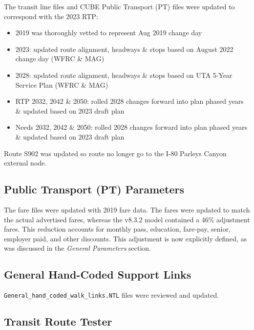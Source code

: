 \documentclass[
  letterpaper,
  DIV=11,
  numbers=noendperiod,
  titlepage=false]{scrreprt}
\providecommand{\tightlist}{%
  \setlength{\itemsep}{0pt}\setlength{\parskip}{0pt}}\usepackage{longtable,booktabs,array}
\begin{document}
The transit line files and CUBE Public Transport (PT) files were updated
to correspond with the 2023 RTP:

\begin{itemize}
\tightlist
\item
  2019 was thoroughly vetted to represent Aug 2019 change day
\item
  2023: updated route alignment, headways \& stops based on August 2022
  change day (WFRC \& MAG)
\item
  2028: updated route alignment, headways \& stops based on UTA 5-Year
  Service Plan (WFRC \& MAG)
\item
  RTP 2032, 2042 \& 2050: rolled 2028 changes forward into plan phased
  years \& updated based on 2023 draft plan
\item
  Needs 2032, 2042 \& 2050: rolled 2028 changes forward into plan phased
  years \& updated based on 2023 draft plan
\end{itemize}

Route S902 was updated so route no longer go to the I-80 Parleys Canyon
external node.

\hypertarget{public-transport-pt-parameters}{%
\subsection{Public Transport (PT)
Parameters}\label{public-transport-pt-parameters}}

The fare files were updated with 2019 fare data. The fares were updated
to match the actual advertised fares, whereas the v8.3.2 model contained
a 46\% adjustment fares. This reduction accounts for monthly pass,
education, fare-pay, senior, employer paid, and other discounts. This
adjustment is now explicitly defined, as was discussed in the
\emph{General Parameters} section.

\hypertarget{general-hand-coded-support-links}{%
\subsection{General Hand-Coded Support
Links}\label{general-hand-coded-support-links}}

\texttt{General\_hand\_coded\_walk\_links.NTL} files were reviewed and
updated.

\hypertarget{transit-route-tester}{%
\subsection{Transit Route Tester}\label{transit-route-tester}}
\end{document}
